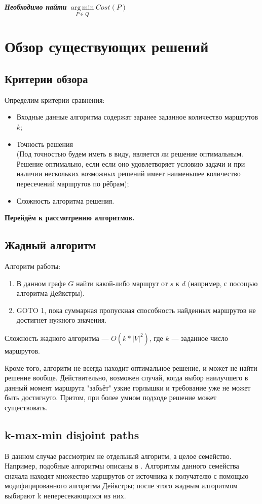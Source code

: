 \documentclass[a4paper]{article}
\DeclareMathOperator*{\argmin}{arg\,min}
\begin{document}
\textit{\textbf{Необходимо найти}} $\argmin\limits_{P\in Q} Cost(P)$

\bigskip
\section{Обзор существующих решений}
\subsection{Критерии обзора}
Определим критерии сравнения:
\begin{itemize}
\item Входные данные алгоритма содержат заранее заданное количество маршрутов $k$;
\item Точность решения\\(Под точностью будем иметь в виду, является ли решение оптимальным. Решение оптимально, если если оно удовлетворяет условию задачи и при наличии нескольких возможных решений имеет наименьшее количество пересечений маршрутов по рёбрам);
\item Сложность алгоритма решения.
\end{itemize}

\textbf{Перейдём к рассмотрению алгоритмов.}

\subsection{Жадный алгоритм}
Алгоритм работы:
\begin{enumerate}
\item В данном графе $G$ найти какой-либо маршрут от $s$ к $d$ (например, с посощью алгоритма Дейкстры).
\item GOTO 1, пока суммарная пропускная способность найденных маршрутов не достигнет нужного значения.
\end{enumerate}

Сложность жадного алгоритма --- $O(k*|V|^2)$, где $k$ --- заданное число маршрутов.

Кроме того, алгоритм не всегда находит оптимальное решение, и может не найти решение вообще. Действительно, возможен случай, когда выбор наилучшего в данный момент маршрута "забьёт" узкие горлышки и требование уже не может быть достигнуто. Притом, при более умном подходе решение может существовать.

\subsection{k-max-min disjoint paths}
В данном случае рассмотрим не отдельный алгоритм, а целое семейство. Например, подобные алгоритмы описаны в \cite{kmaxmin1, kmaxmin2}. Алгоритмы данного семейства сначала находят множество маршрутов от источника к получателю с помощью модифицированного алгоритма Дейкстры; после этого жадным алгоритмом выбирают k непересекающихся из них.
\end{document}
